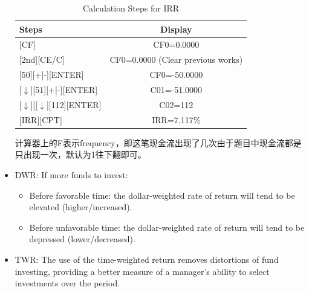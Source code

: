 \begin{itemize}
\begin{table}[h]
    \centering
    \caption{Calculation Steps for IRR}
    \begin{tabular}{@{}lc@{}}
        \toprule
        Steps & Display \\
        \midrule
        {[}CF{]} & CF0=0.0000 \\
        {[}2nd{]}{[}CE/C{]} & CF0=0.0000 (Clear previous works) \\
        {[}50{]}{[}+|-{]}{[}ENTER{]} & CF0=-50.0000 \\
        {[}$\downarrow${]}{[}51{]}{[}+|-{]}{[}ENTER{]} & C01=-51.0000 \\
        {[}$\downarrow${]}{[}{[}$\downarrow${]}{[}112{]}{[}ENTER{]} & C02=112 \\
        {[}IRR{]}{[}CPT{]} & IRR=7.117\% \\
        \bottomrule
    \end{tabular}
\end{table}

计算器上的F表示frequency，即这笔现金流出现了几次由于题目中现金流都是只出现一次，默认为1往下翻即可。


\item DWR: If more funds to invest:
    \begin{itemize}
    \item Before favorable time: the dollar-weighted rate of return will tend to be elevated (higher/increased).
    \item Before unfavorable time: the dollar-weighted rate of return will tend to be depressed (lower/decreased).
    \end{itemize}
\item TWR: The use of the time-weighted return removes distortions of fund investing, providing a better measure of a manager's ability to select investments over the period.
\end{itemize}



